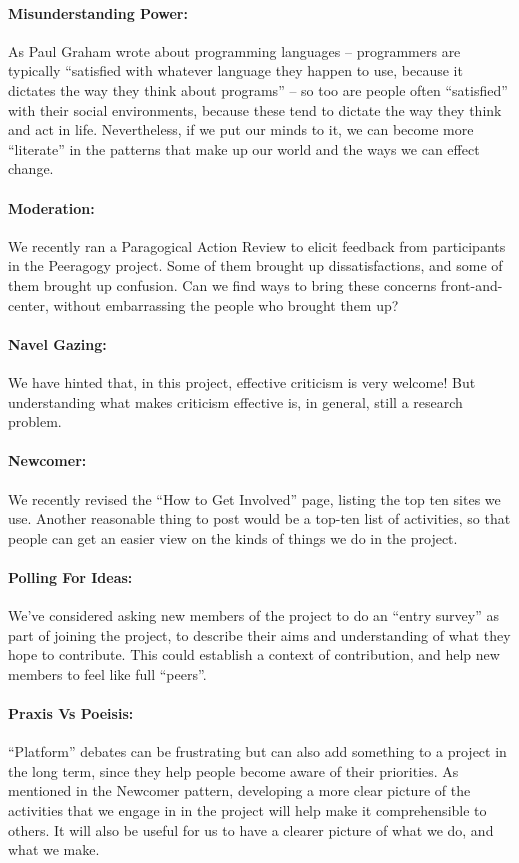 \paragraph{Misunderstanding Power:} As Paul Graham wrote about programming languages – programmers are
typically “satisfied with whatever language they happen to use, because
it dictates the way they think about programs” – so too are people often
“satisfied” with their social environments, because these tend to
dictate the way they think and act in life. Nevertheless, if we put our
minds to it, we can become more “literate” in the patterns that make up
our world and the ways we can effect change.

\paragraph{Moderation:} We recently ran a Paragogical Action Review to elicit feedback from
participants in the Peeragogy project. Some of them brought up
dissatisfactions, and some of them brought up confusion. Can we find
ways to bring these concerns front-and-center, without embarrassing the
people who brought them up?

\paragraph{Navel Gazing:} We have hinted that, in this project, effective criticism is very
welcome! But understanding what makes criticism effective is, in
general, still a research problem.

\paragraph{Newcomer:} We recently revised the “How to Get Involved” page, listing the top ten
sites we use. Another reasonable thing to post would be a top-ten list
of activities, so that people can get an easier view on the kinds of
things we do in the project.

\paragraph{Polling For Ideas:} We’ve considered asking new members of the project to do an “entry survey” as part of joining the project, to describe their aims and
understanding of what they hope to contribute. This could establish a
context of contribution, and help new members to feel like full “peers”.

\paragraph{Praxis Vs Poeisis:} “Platform” debates can be frustrating but can also add something to a project in the long term, since they help people become aware of their
priorities. As mentioned in the Newcomer pattern, developing a more clear
picture of the activities that we engage in in the project will help
make it comprehensible to others. It will also be useful for us to have
a clearer picture of what we do, and what we make.

